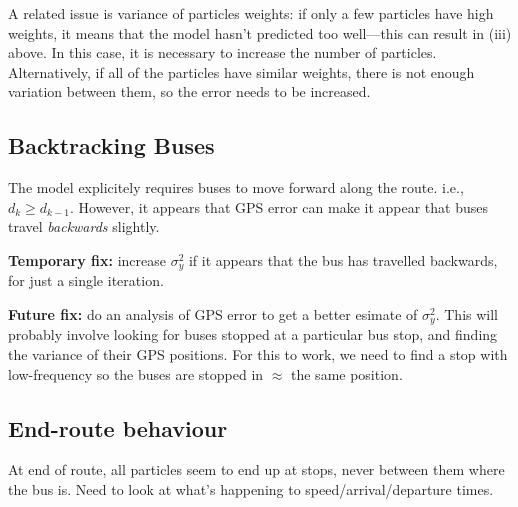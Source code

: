 \documentclass[10pt,a4paper]{article}
\begin{document}
A related issue is variance of particles weights: if only a few particles have high weights, it means that 
the model hasn't predicted too well---this can result in (iii) above. 
In this case, it is necessary to increase the number of particles.
Alternatively, if all of the particles have similar weights, there is not enough variation between them,
so the error needs to be increased.


\subsection{Backtracking Buses}

The model explicitely requires buses to move forward along the route. 
i.e., $d_k \geq d_{k-1}$.
However, it appears that GPS error can make it appear that buses travel \emph{backwards} slightly.

\textbf{Temporary fix:} increase $\sigma_y^2$ if it appears that the bus has travelled backwards, 
for just a single iteration.

\textbf{Future fix:} do an analysis of GPS error to get a better esimate of $\sigma_y^2$.
This will probably involve looking for buses stopped at a particular bus stop, 
and finding the variance of their GPS positions.
For this to work, we need to find a stop with low-frequency so the buses are stopped in $\approx$ the same position.



\subsection{End-route behaviour}

At end of route, all particles seem to end up at stops, never between them where the bus is.
Need to look at what's happening to speed/arrival/departure times.
\end{document}
